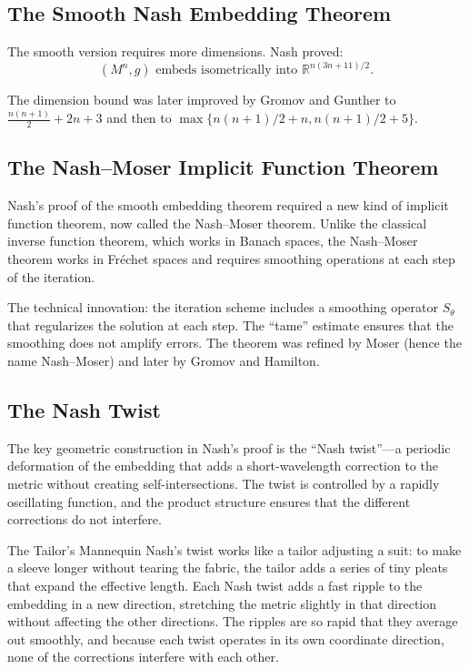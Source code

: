 \subsection{The Smooth Nash Embedding Theorem}

The smooth version requires more dimensions. Nash proved:
\[
(M^n, g) \text{ embeds isometrically into } \mathbb{R}^{n(3n+11)/2}.
\]

The dimension bound was later improved by Gromov and Gunther to $\frac{n(n+1)}{2} + 2n + 3$ and then to $\max\{ n(n+1)/2 + n, n(n+1)/2 + 5 \}$.

\subsection{The Nash--Moser Implicit Function Theorem}

Nash's proof of the smooth embedding theorem required a new kind of implicit function theorem, now called the Nash--Moser theorem. Unlike the classical inverse function theorem, which works in Banach spaces, the Nash--Moser theorem works in Fr\'echet spaces and requires smoothing operations at each step of the iteration.

The technical innovation: the iteration scheme includes a smoothing operator $S_\theta$ that regularizes the solution at each step. The ``tame'' estimate ensures that the smoothing does not amplify errors. The theorem was refined by Moser (hence the name Nash--Moser) and later by Gromov and Hamilton.

\subsection{The Nash Twist}

The key geometric construction in Nash's proof is the ``Nash twist''---a periodic deformation of the embedding that adds a short-wavelength correction to the metric without creating self-intersections. The twist is controlled by a rapidly oscillating function, and the product structure ensures that the different corrections do not interfere.

\begin{analogy}{The Tailor's Mannequin}
Nash's twist works like a tailor adjusting a suit: to make a sleeve longer without tearing the fabric, the tailor adds a series of tiny pleats that expand the effective length. Each Nash twist adds a fast ripple to the embedding in a new direction, stretching the metric slightly in that direction without affecting the other directions. The ripples are so rapid that they average out smoothly, and because each twist operates in its own coordinate direction, none of the corrections interfere with each other.
\end{analogy}


